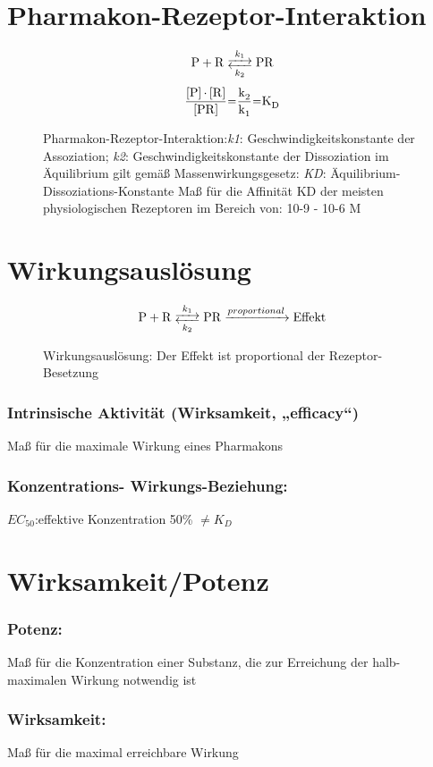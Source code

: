 \documentclass[10pt,a4paper]{report}
\newenvironment{reaction}{\begin{equation}}{\end{equation}}
\begin{document}
\section{Pharmakon-Rezeptor-Interaktion}
\begin{figure}[h]
\begin{reaction}
	\ce{P + R <-->[{k_1}][{k_2}] PR}
\end{reaction}	
\begin{reaction}
	\ce{\frac{[P] * [R]}{[PR]}=\frac{k_2}{k_1}=K_D}
\end{reaction}
\caption{Pharmakon-Rezeptor-Interaktion:\textit{k1}: Geschwindigkeitskonstante der Assoziation;
\textit{k2}: Geschwindigkeitskonstante der Dissoziation 
im Äquilibrium gilt gemäß Massenwirkungsgesetz:
\textit{KD}: Äquilibrium-Dissoziations-Konstante
       Maß für die Affinität
KD der meisten physiologischen Rezeptoren im Bereich von: 10-9 - 10-6 M}
\end{figure}
\section{Wirkungsauslösung}
\begin{figure}
\begin{reaction}
	\ce{P + R <-->[{k_1}][{k_2}] PR ->[{proportional}] Effekt}
\end{reaction}
\caption{Wirkungsauslösung: Der Effekt ist proportional der Rezeptor-Besetzung}
\end{figure}

\subsubsection{Intrinsische Aktivität 
(Wirksamkeit, „efficacy“)}Maß für die maximale Wirkung 
eines Pharmakons
\subsubsection{Konzentrations-
Wirkungs-Beziehung:}$EC_{50}$:effektive Konzentration 50\% $\neq K_D$
\section{Wirksamkeit/Potenz}
\subsubsection{Potenz:}Maß für die 
Konzentration einer Substanz, 
die zur Erreichung der halb-
maximalen Wirkung 
notwendig ist
\subsubsection{Wirksamkeit:}Maß für 
die maximal erreichbare 
Wirkung
\end{document}
